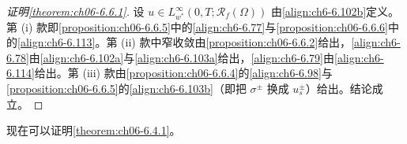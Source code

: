 \documentclass[../../main.tex]{subfiles}%
\begin{document}
\begin{proof}[证明\cref{theorem:ch06-6.6.1}]
设 $u\in L^\infty_{w^*}(0,T;\mathscr{R}_f(\Omega))$ 由\eqref{align:ch6-6.102b}定义。第 (i) 款即\cref{proposition:ch06-6.6.5}中的\eqref{align:ch6-6.77}与\cref{proposition:ch06-6.6.6}中的\eqref{align:ch6-6.113}。第 (ii) 款中窄收敛由\cref{proposition:ch06-6.6.2}给出，\eqref{align:ch6-6.78}由\eqref{align:ch6-6.102a}与\eqref{align:ch6-6.103a}给出，\eqref{align:ch6-6.79}由\eqref{align:ch6-6.114}给出。第 (iii) 款由\cref{proposition:ch06-6.6.4}的\eqref{align:ch6-6.98}与\cref{proposition:ch06-6.6.5}的\eqref{align:ch6-6.103b}（即把 $\sigma^\pm$ 换成 $u^\pm_s$）给出。结论成立。
\end{proof}

现在可以证明\cref{theorem:ch06-6.4.1}。
\end{document}
